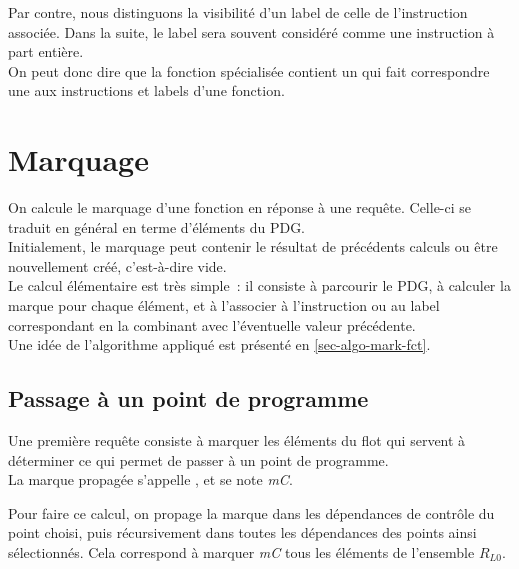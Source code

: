 Par contre, nous distinguons la visibilité d'un label de celle de l'instruction
associée. Dans la suite, le label sera souvent considéré comme une instruction à
part entière.\\

On peut donc dire que
la fonction spécialisée contient un 
qui fait correspondre une  
aux instructions et labels d'une fonction.

\section{Marquage}

On calcule le marquage d'une fonction en réponse à une requête.
Celle-ci se traduit en général en terme d'éléments du PDG.\\

Initialement, le marquage
peut contenir le résultat de précédents calculs ou être
nouvellement créé, c'est-à-dire vide.\\

Le calcul élémentaire est très simple~:
il consiste à parcourir le PDG,
à calculer la marque pour chaque élément,
et à l'associer à l'instruction ou au label correspondant
en la combinant avec l'éventuelle valeur précédente.\\

Une idée de l'algorithme appliqué est présenté en \ref{sec-algo-mark-fct}.


\subsection{Passage à un point de programme}

Une première requête consiste à marquer les éléments du flot
qui servent à déterminer ce qui permet de passer
à un point de programme.\\

La marque propagée s'appelle
,
et se note {\it mC}.

Pour faire ce calcul, on propage la marque dans les dépendances de contrôle du
point choisi, puis récursivement dans toutes les dépendances des points ainsi
sélectionnés. Cela correspond à marquer  {\it mC} tous les éléments
de l'ensemble $R_{L0}$.

